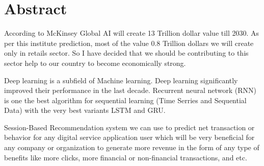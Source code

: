 \doublespacing
\chapter*{Abstract}
\thispagestyle{empty}

According to McKinsey Global AI will create 13 Trillion dollar value till 2030. As per this institute prediction, most of the value 0.8 Trillion dollars we will create only in retails sector. So I have decided that we should be contributing to this sector help to our country to become economically strong. 

Deep learning is a subfield of Machine learning. Deep learning significantly improved their performance in the last decade. Recurrent neural network (RNN) is one the best algorithm for sequential learning (Time Serries and Sequential Data) with the very best variants LSTM and GRU. 

Session-Based Recommendation system we can use to predict net transaction or behavior for any digital service application user which will be very beneficial for any company or organization to generate more revenue in the form of any type of benefits like more clicks, more financial or non-financial transactions, and etc.

